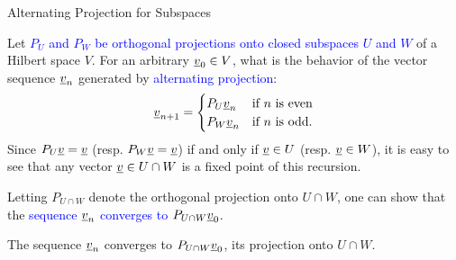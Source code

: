 \documentclass[10pt,english,aspectratio=169]{beamer}
\begin{document}
\begin{frame}{Alternating Projection for Subspaces}

Let \textcolor{blue}{$P_{U}$ and $P_{W}$ be orthogonal projections onto closed subspaces $U$ and $W$} of a Hilbert space $V$. For an arbitrary $\underline v_{0}\in V$, what is the behavior of the vector sequence $\underline{v}_n$ generated by \textcolor{blue}{alternating projection}:
\begin{equation*}
\underline v_{n+1}=\begin{cases}
P_{U}\underline v_{n} & \text{if }n\text{ is even}\\
P_{W}\underline v_{n} & \text{if }n\text{ is odd}.
\end{cases}
\end{equation*}
Since $P_{U}\underline v=\underline v$ (resp. $P_{W}\underline v=\underline v$) if and only if $\underline v\in U$ (resp. $\underline v\in W$), it is easy to see that any vector $\underline v\in U\cap W$ is a fixed point of this recursion.

\vspace{3mm}

Letting $P_{U\cap W}$ denote the orthogonal projection onto $U\cap W$, one can show that the \textcolor{blue}{sequence $\underline v_{n}$ converges to $P_{U\cap W}\underline v_{0}$}.

\vspace{2mm}

\begin{theorem}
The sequence $\underline v_{n}$ converges to $P_{U\cap W}\underline v_{0}$, its projection onto $U\cap W$.
\end{theorem}


\end{frame}

\end{document}
